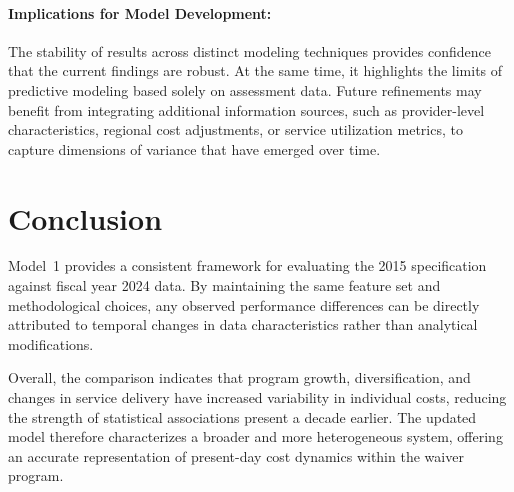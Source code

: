 \paragraph{Implications for Model Development:} 
The stability of results across distinct modeling techniques provides confidence that the current findings are robust.  
At the same time, it highlights the limits of predictive modeling based solely on assessment data.  Future refinements may benefit from integrating additional information sources, such as provider-level characteristics, regional cost adjustments, or service utilization metrics, to capture dimensions of variance that have emerged over time.

\section{Conclusion}

Model~1 provides a consistent framework for evaluating the 2015 specification against fiscal year 2024 data.  
By maintaining the same feature set and methodological choices, any observed performance differences can be directly attributed to temporal changes in data characteristics rather than analytical modifications.

Overall, the comparison indicates that program growth, diversification, and changes in service delivery have increased variability in individual costs, reducing the strength of statistical associations present a decade earlier.  
The updated model therefore characterizes a broader and more heterogeneous system, offering an accurate representation of present-day cost dynamics within the waiver program.


